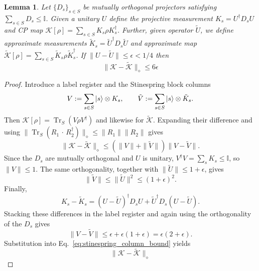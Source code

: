 \documentclass[aps,floatfix,10pt,amssymb,amsfont,amsmath,superscriptaddress,float,nofootinbib,longbibliography,nobalancelastpage,twocolumn]{revtex4-2}
\newtheorem{lemma}{Lemma}
\begin{document}
\begin{widetext}
\begin{lemma}
\label{lemma:3}
Let $\{D_s\}_{s\in S}$ be mutually orthogonal projectors satisfying $\sum_{s\in S} D_s \leq \mathbb{I}$. Given a unitary $U$ define the projective measurement $K_s = U^{\dagger}D_s U$ and CP map $\mathcal{K}[\rho] = \sum_{s \in S} K_s\rho K_s^{\dagger}$. Further, given operator $\tilde U$, we define approximate measurements $\tilde K_s = \tilde U^{\dagger}D_s \tilde U$ and approximate map $\tilde{\mathcal{K}}[\rho] = \sum_{s \in S} \tilde K_s\rho \tilde K_s^{\dagger}$. If $\|U-\tilde U\| \leq \epsilon<1/4$ then
\begin{equation}
    \|\mathcal{K} - \tilde{\mathcal{K}}\|_{\diamond} \leq 6\epsilon
\end{equation}
\end{lemma}
\begin{proof}
Introduce a label register and the Stinespring block columns
\begin{equation*}
 V:=\sum_{s\in S}\ket{s}\otimes K_s,\qquad
 \tilde V:=\sum_{s\in S}\ket{s}\otimes\tilde K_s .
\end{equation*}
Then
$\mathcal K[\rho]=\operatorname{Tr}_{S}(V\rho V^\dagger)$ and likewise
for $\tilde{\mathcal K}$.  Expanding their difference and using
$\|\operatorname{Tr}_{S}(R_1\,\cdot\,R_2^\dagger)\|_\diamond
\leq\|R_1\|\|R_2\|$ gives
\begin{equation}
 \|\mathcal K-\tilde{\mathcal K}\|_\diamond
 \leq(\|V\|+\|\tilde V\|)\|V-\tilde V\|.
 \label{eq:stinespring_column_bound}
\end{equation}
Since the $D_s$ are mutually orthogonal and $U$ is unitary,
$V^\dagger V=\sum_sK_s\leq\mathbb I$, so $\|V\|\leq1$.  The same
orthogonality, together with $\|\tilde U\|\leq1+\epsilon$, gives
\begin{equation*}
 \|\tilde V\|\leq\|\tilde U\|^2\leq(1+\epsilon)^2.
\end{equation*}
Finally,
\begin{equation*}
 K_s-\tilde K_s
 =(U-\tilde U)^\dagger D_sU
 +\tilde U^\dagger D_s(U-\tilde U).
\end{equation*}
Stacking these differences in the label register and again using the
orthogonality of the $D_s$ gives
\begin{equation*}
 \|V-\tilde V\|\leq\epsilon+\epsilon(1+\epsilon)
 =\epsilon(2+\epsilon).
\end{equation*}
Substitution into Eq.~\eqref{eq:stinespring_column_bound} yields
\begin{equation*}
 \|\mathcal K-\tilde{\mathcal K}\|_\diamond

\end{equation*}
\end{proof}
\end{widetext}
\end{document}
